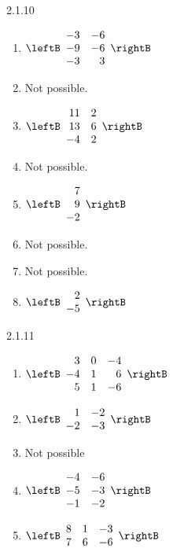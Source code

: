 \begin{Answer}{2.1.10}
\begin{enumerate}
\item $\leftB
\begin{array}{rr}
-3 & -6 \\
-9 & -6 \\
-3 & 3
\end{array}
\rightB$
\item Not possible.
\item $\leftB
\begin{array}{rr}
11 & 2 \\
13 & 6 \\
-4 & 2
\end{array}
\rightB$
\item Not possible.
\item $\leftB
\begin{array}{r}
7 \\
9 \\
-2
\end{array}
\rightB$
\item Not possible.
\item Not possible.
\item $\leftB
\begin{array}{r}
2 \\
-5
\end{array}
\rightB$
\end{enumerate}
\end{Answer}
\begin{Answer}{2.1.11}
\begin{enumerate}
\item $\leftB
\begin{array}{rrr}
3 & 0 & -4 \\
-4 & 1 & 6 \\
5 & 1 & -6
\end{array}
\rightB $
\item $\leftB
\begin{array}{rr}
1 & -2 \\
-2 & -3
\end{array}
\rightB $
\item Not possible
\item $\leftB
\begin{array}{rr}
-4 & -6 \\
-5 & -3 \\
-1 & -2
\end{array}
\rightB $
\item $\leftB
\begin{array}{rrr}
8 & 1 & -3 \\
7 & 6 & -6
\end{array}
\rightB $
\end{enumerate}
\end{Answer}
